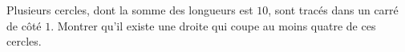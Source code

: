 Plusieurs cercles, dont la somme des longueurs est $10$, sont tracés dans un carré de côté $1$. Montrer qu'il existe une droite qui coupe au moins quatre de ces cercles.
